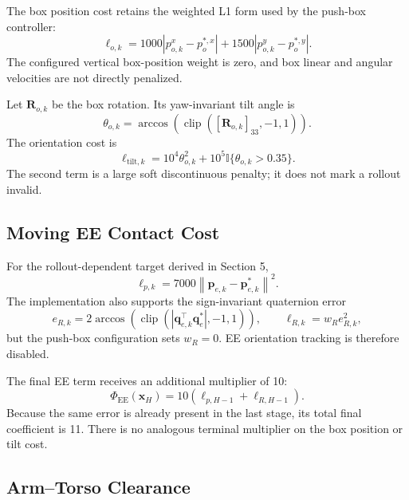 \documentclass[11pt,a4paper]{article}
\newcommand{\sqnorm}[1]{\left\lVert #1 \right\rVert^2}
\newcommand{\clip}{\operatorname{clip}}
\begin{document}
The box position cost retains the weighted L1 form used by the push-box
controller:
\begin{equation}
  \boxed{
  \ell_{o,k}
  =1000|p_{o,k}^x-p_o^{*,x}|
   +1500|p_{o,k}^y-p_o^{*,y}|.
  }
\end{equation}
The configured vertical box-position weight is zero, and box linear and
angular velocities are not directly penalized.

Let $\bm{R}_{o,k}$ be the box rotation. Its yaw-invariant tilt angle is
\begin{equation}
  \theta_{o,k}=\arccos\!\left(
  \clip([\bm{R}_{o,k}]_{33},-1,1)\right).
\end{equation}
The orientation cost is
\begin{equation}
  \ell_{\mathrm{tilt},k}
  =10^4\theta_{o,k}^2
   +10^5\mathbb{I}\{\theta_{o,k}>0.35\}.
\end{equation}
The second term is a large soft discontinuous penalty; it does not mark a
rollout invalid.

\subsection{Moving EE Contact Cost}

For the rollout-dependent target derived in Section 5,
\begin{equation}
  \ell_{p,k}
  =7000\sqnorm{\bm{p}_{e,k}-\bm{p}_{e,k}^*}.
\end{equation}
The implementation also supports the sign-invariant quaternion error
\begin{equation}
  e_{R,k}
  =2\arccos\left(
  \clip(|\bm{q}_{e,k}^\top\bm{q}_e^*|,-1,1)\right),
  \qquad
  \ell_{R,k}=w_R e_{R,k}^2,
\end{equation}
but the push-box configuration sets $w_R=0$. EE orientation tracking is
therefore disabled.

The final EE term receives an additional multiplier of 10:
\begin{equation}
  \Phi_{\mathrm{EE}}(\bm{x}_H)
  =10(\ell_{p,H-1}+\ell_{R,H-1}).
\end{equation}
Because the same error is already present in the last stage, its total final
coefficient is 11. There is no analogous terminal multiplier on the box
position or tilt cost.

\subsection{Arm--Torso Clearance}
\end{document}
